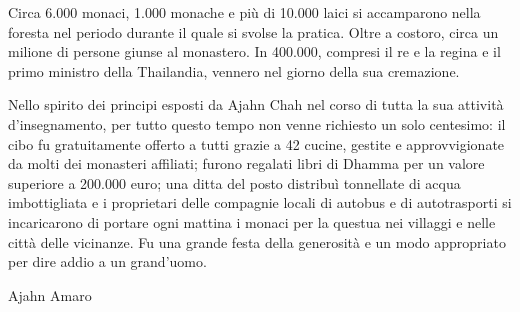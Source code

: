 Circa 6.000 monaci, 1.000 monache e più di 10.000 laici si accamparono
nella foresta nel periodo durante il quale si svolse la pratica. Oltre a
costoro, circa un milione di persone giunse al monastero. In 400.000,
compresi il re e la regina e il primo ministro della Thailandia, vennero
nel giorno della sua cremazione.

Nello spirito dei principi esposti da Ajahn Chah nel corso di tutta la
sua attività d'insegnamento, per tutto questo tempo non venne richiesto
un solo centesimo: il cibo fu gratuitamente offerto a tutti grazie a 42
cucine, gestite e approvvigionate da molti dei monasteri affiliati;
furono regalati libri di Dhamma per un valore superiore a 200.000 euro;
una ditta del posto distribuì tonnellate di acqua imbottigliata e i
proprietari delle compagnie locali di autobus e di autotrasporti si
incaricarono di portare ogni mattina i monaci per la questua nei
villaggi e nelle città delle vicinanze. Fu una grande festa della
generosità e un modo appropriato per dire addio a un grand'uomo.

{\raggedleft
  Ajahn Amaro\par
}

